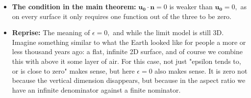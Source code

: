 \documentclass[11pt]{article}
\begin{document}
\begin{itemize}
\item \textbf{The condition in the main theorem:}  $\mathbf{u_0} \cdot \mathbf{n} = 0$ is weaker than $\mathbf{u_0} = 0,$ as on every surface it only requires one function out of the three to be zero.

\item \textbf{Reprise:} The meaning of $\epsilon = 0,$ and while the limit model is still 3D. Imagine something similar to what the Earth looked like for people a more or less thousand years ago: a flat, infinite 2D surface, and of course we combine this with above it some layer of air. For this case, not just "epsilon tends to, or is close to zero" makes sense, but here $\epsilon = 0$ also makes sense. It is zero not because the vertical dimension disappears, but because in the aspect ratio we have an infinite denominator against a finite nominator.
 
\end{itemize}
\end{document}

